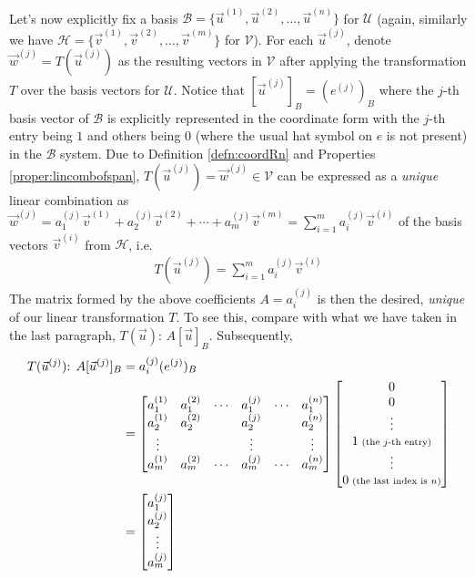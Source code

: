 \\
Let's now explicitly fix a basis $\mathcal{B} = \{\vec{u}^{(1)}, \vec{u}^{(2)}, \ldots, \vec{u}^{(n)}\}$ for $\mathcal{U}$ (again, similarly we have $\mathcal{H} = \{\vec{v}^{(1)}, \vec{v}^{(2)}, \ldots, \vec{v}^{(m)}\}$ for $\mathcal{V}$). For each $\vec{u}^{(j)}$, denote $\vec{w}^{(j)} = T(\vec{u}^{(j)})$ as the resulting vectors in $\mathcal{V}$ after applying the transformation $T$ over the basis vectors for $\mathcal{U}$. Notice that $[\vec{u}^{(j)}]_B = (e^{(j)})_B$ where the $j$-th basis vector of $\mathcal{B}$ is explicitly represented in the coordinate form with the $j$-th entry being $1$ and others being $0$ (where the usual hat symbol on $e$ is not present) in the $\mathcal{B}$ system. Due to Definition \ref{defn:coordRn} and Properties \ref{proper:lincombofspan}, $T(\vec{u}^{(j)}) = \vec{w}^{(j)} \in \mathcal{V}$ can be expressed as a \textit{unique} linear combination as $\vec{w}^{(j)} = a_1^{(j)}\vec{v}^{(1)} + a_2^{(j)}\vec{v}^{(2)} + \cdots + a_m^{(j)}\vec{v}^{(m)} = \sum_{i=1}^{m} a_i^{(j)}\vec{v}^{(i)}$ of the basis vectors $\vec{v}^{(i)}$ from $\mathcal{H}$, i.e.
\begin{align*}
T(\vec{u}^{(j)}) = \sum_{i=1}^{m} a_i^{(j)}\vec{v}^{(i)}
\end{align*}
The matrix formed by the above coefficients $A = a_i^{(j)}$ is then the desired, \textit{unique}  of our linear transformation $T$. To see this, compare with what we have taken in the last paragraph, $T(\vec{u})$: $A[\vec{u}]_B$. Subsequently,
\begin{align*}
T(\vec{u}^{(j)})\text{: } A[\vec{u}^{(j)}]_B &= a_i^{(j)}(e^{(j)})_B \\
&=
\begin{bmatrix}
a_1^{(1)} & a_1^{(2)} & \cdots & a_1^{(j)} & \cdots & a_1^{(n)} \\
a_2^{(1)} & a_2^{(2)} & & a_2^{(j)} & & a_2^{(n)} \\
\vdots & & & \vdots & & \vdots \\
a_m^{(1)} & a_m^{(2)} & \cdots & a_m^{(j)} & \cdots & a_m^{(n)}
\end{bmatrix}
\begin{bmatrix}
0 \\
0 \\
\vdots \\
1 {\scriptsize \text{ (the $j$-th entry)}} \\
\vdots \\
0 {\scriptsize \text{ (the last index is $n$)}}
\end{bmatrix} \\
&=
\begin{bmatrix}
a_1^{(j)} \\
a_2^{(j)} \\
\vdots \\
a_m^{(j)}
\end{bmatrix}
\end{align*}
